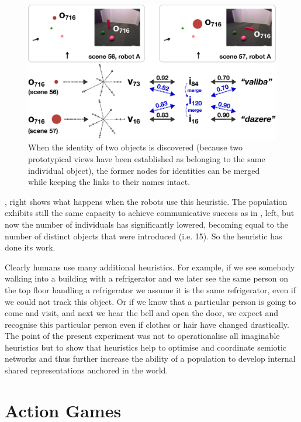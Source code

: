 \begin{figure}[htbp]
  \centerline{\includegraphics[width=.75\textwidth]{chap11/figs/adjust-id.pdf}}
\caption{\label{fig:png-optimisation}When the identity of two objects is discovered (because two prototypical views have been established 
as belonging to the same individual object), the former nodes for identities can be merged while keeping the 
links to their names intact. 
}
\end{figure}

, right shows what happens when the robots use this heuristic. The population
exhibits still the same capacity to achieve communicative success as
in , left, but now the number of individuals
has significantly lowered, becoming equal to the number of distinct objects 
that were introduced (i.e. 15). So the heuristic has done its work. 

Clearly humans use many additional heuristics. For example, if we see somebody walking into a
building with a refrigerator and we later see the same person on the
top floor handling a refrigerator we assume it is the same
refrigerator, even if we could not track this object. Or if we know that a particular person is 
going to come and visit, and next we hear the bell and open the door, we expect and recognise this particular 
person even if clothes or hair have changed drastically. The
point of the present experiment was not to operationalise all imaginable heuristics but to
show that heuristics help to optimise and coordinate semiotic
networks and thus further increase the ability of a population to develop internal shared
representations anchored in the world.

\section{Action Games} 

